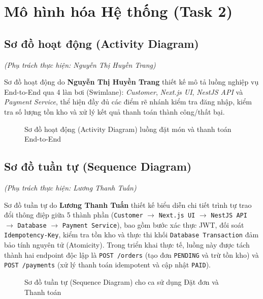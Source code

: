 \section{Mô hình hóa Hệ thống (Task 2)}

\subsection{Sơ đồ hoạt động (Activity Diagram)}
\textit{(Phụ trách thực hiện: Nguyễn Thị Huyền Trang)}

Sơ đồ hoạt động do \textbf{Nguyễn Thị Huyền Trang} thiết kế mô tả luồng nghiệp vụ End-to-End qua 4 làn bơi (Swimlane): \textit{Customer}, \textit{Next.js UI}, \textit{NestJS API} và \textit{Payment Service}, thể hiện đầy đủ các điểm rẽ nhánh kiểm tra đăng nhập, kiểm tra số lượng tồn kho và xử lý kết quả thanh toán thành công/thất bại.

\begin{figure}[H]
\centering
{}
\caption{Sơ đồ hoạt động (Activity Diagram) luồng đặt món và thanh toán End-to-End}
\end{figure}

\clearpage
\subsection{Sơ đồ tuần tự (Sequence Diagram)}
\textit{(Phụ trách thực hiện: Lương Thanh Tuấn)}

Sơ đồ tuần tự do \textbf{Lương Thanh Tuấn} thiết kế biểu diễn chi tiết trình tự trao đổi thông điệp giữa 5 thành phần (\texttt{Customer} $\rightarrow$ \texttt{Next.js UI} $\rightarrow$ \texttt{NestJS API} $\rightarrow$ \texttt{Database} $\rightarrow$ \texttt{Payment Service}), bao gồm bước xác thực JWT, đối soát \texttt{Idempotency-Key}, kiểm tra tồn kho và thực thi khối \texttt{Database Transaction} đảm bảo tính nguyên tử (Atomicity). Trong triển khai thực tế, luồng này được tách thành hai endpoint độc lập là \texttt{POST /orders} (tạo đơn \texttt{PENDING} và trừ tồn kho) và \texttt{POST /payments} (xử lý thanh toán idempotent và cập nhật \texttt{PAID}).

\begin{figure}[H]
\centering
{}
\caption{Sơ đồ tuần tự (Sequence Diagram) cho ca sử dụng Đặt đơn và Thanh toán}
\end{figure}

